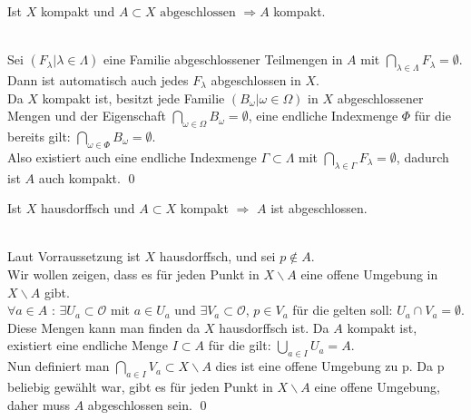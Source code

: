 \begin{Satz}
		Ist \(X\) kompakt und \(A \subset X \mbox{ abgeschlossen } \Rightarrow A\) kompakt.
\end{Satz}
%
	\\
 	Sei \((F_{\lambda} | \lambda \in \Lambda) \) eine Familie abgeschlossener Teilmengen in \(A\) mit \( \bigcap_{\lambda \in \Lambda } F_{\lambda} = \emptyset \).\\
	Dann ist automatisch auch jedes \(F_{\lambda} \) abgeschlossen in \(X\).\\
	Da \(X\) kompakt ist, besitzt jede Familie \((B_{\omega} | \omega \in \Omega) \) in \(X\) abgeschlossener Mengen und der Eigenschaft 
	\( \bigcap_{\omega \in \Omega} B_{\omega} = \emptyset\), eine 
	endliche Indexmenge \(\Phi \) für die bereits gilt: \( \bigcap_{\omega \in \Phi} B_{\omega} = \emptyset\).\\
	Also existiert auch eine endliche Indexmenge \( \Gamma \subset \Lambda \) mit \( \bigcap_{\lambda \in \Gamma } F_{\lambda} = \emptyset \), dadurch ist 
	\(A\) auch kompakt.
\qed
		
		
\begin{Satz}
	Ist \(X\) hausdorffsch und \(A \subset X \) kompakt \( \Rightarrow \) \(A\) ist abgeschlossen.
\end{Satz}
%
	\\
	Laut Vorraussetzung ist \(X\) hausdorffsch, und sei \(p \notin A \). \\
	Wir wollen zeigen, dass es für jeden Punkt in \(X \backslash A \) eine offene Umgebung in \(X \backslash A \) gibt.\\
	\( \forall a \in A\) : \(\exists U_{a}\subset \mathcal{O} \) mit \(  a \in U_{a}\) und \(\exists V_{a}\subset \mathcal{O} \), \(  p \in V_{a}\) für die gelten soll:
	 \(U_{a} \cap V_{a} = \emptyset \). Diese Mengen kann man finden da \(X\) hausdorffsch ist. Da \(A\) kompakt ist, existiert eine endliche Menge \(I \subset A\) für die gilt:
	\( \bigcup_{a \in I} U_{a} = A \). \\
	Nun definiert man \(\bigcap_{a \in I} V_{a} \subset X\backslash A \) dies ist eine offene Umgebung zu p. Da p beliebig gewählt war, gibt es 
	für jeden Punkt in \(X\backslash A \) eine offene Umgebung, daher muss \(A\) abgeschlossen sein. 
\qed
		
